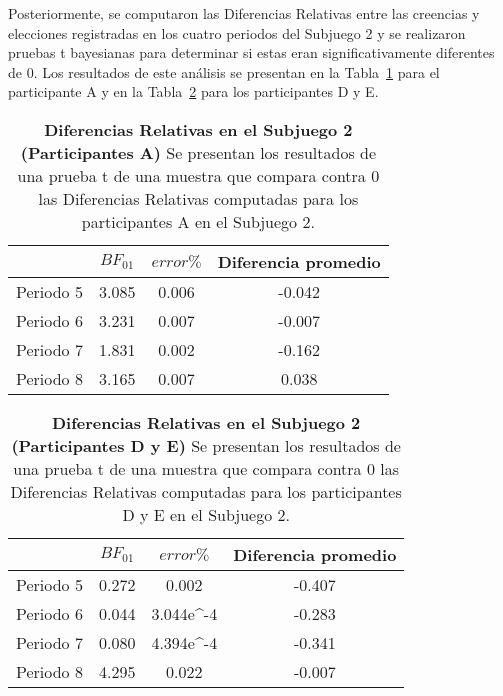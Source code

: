 Posteriormente, se computaron las Diferencias Relativas entre las creencias y elecciones registradas en los cuatro periodos del Subjuego 2 y se realizaron pruebas t bayesianas para determinar si estas eran significativamente diferentes de 0. Los resultados de este análisis se presentan en la Tabla~\ref{DR-S2-A-B} para el participante A y en la Tabla~\ref{DR-S2-DyE-B} para los participantes D y E.\\

\begin{table}[h]
\caption[Diferencias Relativas en el Subjuego 2; Participantes A (Pruebas t de una muestra)]{\textbf{Diferencias Relativas en el Subjuego 2 (Participantes A)} Se presentan los resultados de una prueba t de una muestra que compara contra 0 las Diferencias Relativas computadas para los participantes A en el Subjuego 2.}
\label{DR-S2-A-B}
\centering
\begin{tabular}{l | c c | c}
\toprule
\textbf{} & \textbf{$BF_{01}$} & \textbf{$error\%$} & \textbf{Diferencia promedio}\\
\midrule
Periodo 5 & 3.085 & 0.006 & -0.042\\
Periodo 6 & 3.231 & 0.007 & -0.007\\
Periodo 7 & 1.831 & 0.002 & -0.162\\
Periodo 8 & 3.165 & 0.007 & 0.038\\
\bottomrule
\end{tabular}
\end{table}

\begin{table}[h]
\caption[Diferencias Relativas en el Subjuego 2; Participantes D y E (Pruebas t de una muestra)]{\textbf{Diferencias Relativas en el Subjuego 2 (Participantes D y E)} Se presentan los resultados de una prueba t de una muestra que compara contra 0 las Diferencias Relativas computadas para los participantes D y E en el Subjuego 2.}
\label{DR-S2-DyE-B}
\centering
\begin{tabular}{l | c c | c}
\toprule
\textbf{} & \textbf{$BF_{01}$} & \textbf{$error\%$} & \textbf{Diferencia promedio}\\
\midrule
Periodo 5 & 0.272 & 0.002 & -0.407\\
Periodo 6 & 0.044 & 3.044e^-4 & -0.283\\
Periodo 7 & 0.080 & 4.394e^-4 & -0.341\\
Periodo 8 & 4.295 & 0.022 & -0.007\\
\bottomrule
\end{tabular}
\end{table}
  
